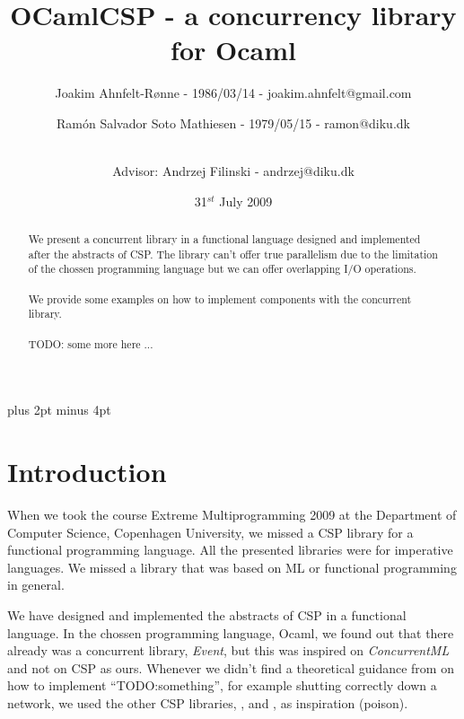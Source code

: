 \documentclass[a4paper,12pt]{article}
\title{OCamlCSP - a concurrency library for Ocaml}
\author{Joakim Ahnfelt-Rønne - 1986/03/14 - joakim.ahnfelt@gmail.com \and 
        Ramón Salvador Soto Mathiesen - 1979/05/15 - ramon@diku.dk \and
        \\ Advisor: Andrzej Filinski - andrzej@diku.dk}
\date{31$^{st}$ July 2009}
\begin{document}
\maketitle

\newpage
{}
\begin{abstract}
We present a concurrent library in a functional language designed and
implemented after the abstracts of CSP\cite{hoare}. The library can't offer true
parallelism due to the limitation of the chossen programming language but we can
offer overlapping I/O operations.
\\ \\
We provide some examples on how to implement components with the concurrent
library.
\\ \\
TODO: some more here ...
\end{abstract}

\newpage
\setcounter{tocdepth}{2}
\setcounter{secttocdepth}{3}
\dosecttoc \tableofcontents
\newpage

\parindent=0pt
\parskip=8pt plus 2pt minus 4pt

\section{Introduction}
When we took the course Extreme Multiprogramming 2009 at the Department of
Computer Science, Copenhagen University, we missed a CSP\cite{hoare} library for
a functional programming language. All the presented libraries were for
imperative languages. We missed a library that was based on ML or functional
programming in general.

We have designed and implemented the abstracts of CSP in a functional
language\cite{ocaml}. In the chossen programming language, Ocaml, we found out
that there already was a concurrent library, {\it Event}, but this was inspired
on {\it ConcurrentML} and not on CSP as ours. Whenever we didn't find a
theoretical guidance from \cite{hoare} on how to implement ``TODO:something'',
for example shutting correctly down a network, we used the other CSP libraries,
\cite{pycsp}, \cite{jcsp} and \cite{cppcsp2}, as inspiration (poison).
\end{document}
